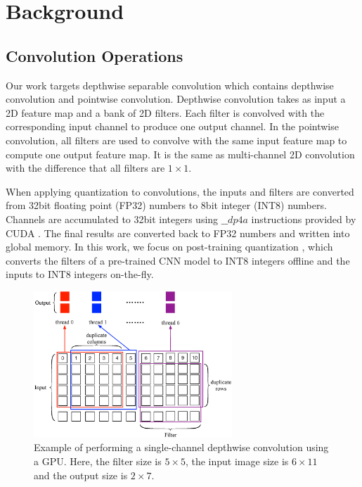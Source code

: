 
\section{Background}
\subsection{Convolution Operations}
Our work targets depthwise separable convolution which contains depthwise convolution and pointwise convolution. Depthwise convolution
takes as input a 2D feature map and a bank of 2D filters. Each filter is convolved with the corresponding input channel to produce one
output channel. In the pointwise convolution, all filters are used to convolve with the same input feature map to compute one output
feature map. It is the same as multi-channel 2D convolution with the difference that all filters are $1 \times 1$.

When applying quantization to convolutions, the inputs and filters are converted from 32bit floating point (FP32) numbers to 8bit integer (INT8) numbers. 
Channels are accumulated to 32bit integers using $\_\_dp4a$ instructions provided by CUDA \cite{cudatoolkit}.
The final results are converted back to FP32 numbers and written into global memory. 
In this work, we focus on post-training quantization \cite{fang2020post,jacob2018quantization}, which converts the filters of a pre-trained CNN model to INT8 integers offline and the inputs to INT8 integers on-the-fly.

\begin{figure}[t!]
\centering
  \includegraphics[width=0.9\columnwidth,height=5.5cm]{./figure/twostrategies.eps}
  \caption{Example of performing a single-channel depthwise convolution using a GPU. Here, the filter size is $5 \times 5$, the input image size is $6 \times 11$
  and the output size is $2 \times 7$.}
  \label{fig:twostrategies}
\end{figure}


